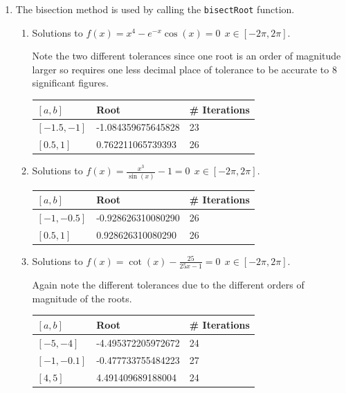 \documentclass[a4paper,11pt]{article}
\begin{document}
\begin{enumerate}
	\item The bisection method is used by calling the \verb*|bisectRoot| 
	function.
	
	
	
	\begin{enumerate}
		\item Solutions to $f(x) = x^{4} - e^{-x} \cos(x) = 0 \  \ 
		x\in[-2\pi,2\pi]$.
		
		Note the two different tolerances since one root is an order of 
		magnitude larger so requires one less decimal place of tolerance to 
		be 
		accurate to 8 significant figures.
		\begin{center}
			\begin{tabular}{l|ll}
				$[a,b]$     & Root       & \# Iterations \\ \hline
				$[-1.5,-1]$ & -1.084359675645828 & 23           \\
				$[0.5,1]$   & 0.762211065739393 & 26          
			\end{tabular}
		\end{center}
		
	
	
		\item Solutions to $f(x) = \frac{x^{3}}{\sin(x)} - 1 = 0 \  \ 
		x\in[-2\pi,2\pi]$.
		
		\begin{center}
			\begin{tabular}{l|ll}
				$[a,b]$     & Root        & \# Iterations \\ \hline
				$[-1,-0.5]$ & -0.928626310080290 & 26            \\
				$[0.5,1]$   & 0.928626310080290  & 26           
			\end{tabular}
		\end{center}
	
	
		\item Solutions to $f(x) = \cot(x)	- \frac{25}{25x-1} = 0 \  \ 
		x\in[-2\pi,2\pi]$.
		
		Again note the different tolerances due to the different orders of 
		magnitude of the roots.
		\begin{center}
			\begin{tabular}{l|ll}
				$[a,b]$     & Root        & \# Iterations \\ \hline
				$[-5,-4]$   & -4.495372205972672  & 24            \\
				$[-1,-0.1]$ & -0.477733755484223 & 27            \\
				$[4,5]$     & 4.491409689188004   & 24           
			\end{tabular}
		\end{center}
		

\end{enumerate}
\end{enumerate}
\end{document}
